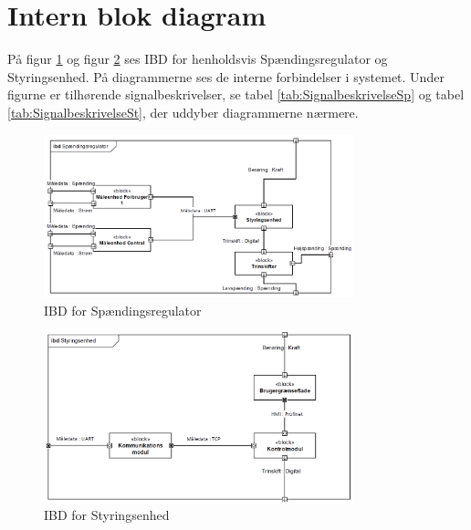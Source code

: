 
\section{Intern blok diagram}
På figur \ref{fig:IBDSp} og figur \ref{fig:IBDSt} ses IBD for henholdsvis Spændingsregulator og Styringsenhed. På diagrammerne ses de interne forbindelser i systemet. Under figurne er tilhørende signalbeskrivelser, se tabel \ref{tab:SignalbeskrivelseSp} og tabel \ref{tab:SignalbeskrivelseSt}, der uddyber diagrammerne nærmere.

\begin{figure}[htbp] %
	\centering
	\includegraphics[width=0.8\textwidth]{Figure/IBDSpaendingsregulator1}
	\caption{IBD for Spændingsregulator}
	\label{fig:IBDSp}
\end{figure}

\begin{figure}[htbp] %
	\centering
	\includegraphics[width=0.8\textwidth]{Figure/IBDStyringsenhed1}
	\caption{IBD for Styringsenhed}
	\label{fig:IBDSt}
\end{figure}



